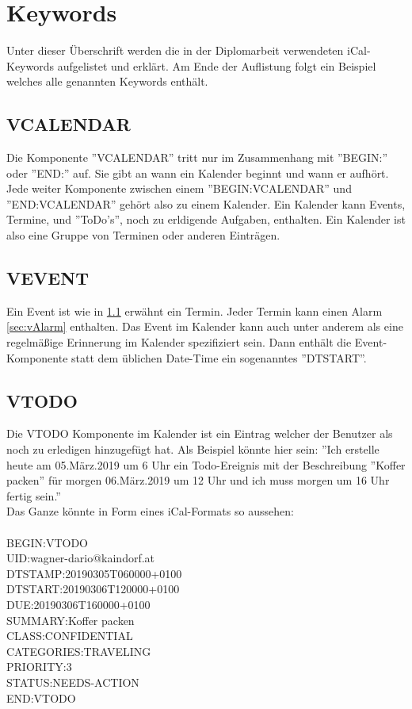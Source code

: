 \section{Keywords}
\label{sec:keywords}
Unter dieser Überschrift werden die in der Diplomarbeit verwendeten iCal-Keywords aufgelistet und erklärt. Am Ende der Auflistung folgt ein Beispiel welches alle genannten Keywords enthält. 
\subsection{VCALENDAR}
\label{sec:vCalendar} 
Die Komponente ''VCALENDAR'' tritt nur im Zusammenhang mit ''BEGIN:'' oder ''END:'' auf. Sie gibt an wann ein Kalender beginnt und wann er aufhört. Jede weiter Komponente zwischen einem ''BEGIN:VCALENDAR'' und ''END:VCALENDAR'' gehört also zu einem Kalender. Ein Kalender kann Events, Termine, und ''ToDo's'', noch zu erldigende Aufgaben, enthalten. Ein Kalender ist also eine Gruppe von Terminen oder anderen Einträgen. 
\subsection{VEVENT}
\label{sec:vEvent} 
Ein Event ist wie in \ref{sec:vCalendar} erwähnt ein Termin. Jeder Termin kann einen Alarm \ref{sec:vAlarm} enthalten. Das Event im Kalender kann auch unter anderem als eine regelmäßige Erinnerung im Kalender spezifiziert sein. Dann enthält die Event-Komponente statt dem üblichen Date-Time ein sogenanntes ''DTSTART''.
\subsection{VTODO}
\label{sec:vTodo} 
Die VTODO Komponente im Kalender ist ein Eintrag welcher der Benutzer als noch zu erledigen hinzugefügt hat. Als Beispiel könnte hier sein: ''Ich erstelle heute am 05.März.2019 um 6 Uhr ein Todo-Ereignis mit der Beschreibung ''Koffer packen'' für morgen 06.März.2019 um 12 Uhr und ich muss morgen um 16 Uhr fertig sein.'' \\
Das Ganze könnte in Form eines iCal-Formats so aussehen: \\ \\
  BEGIN:VTODO \\
  UID:wagner-dario@kaindorf.at\\
  DTSTAMP:20190305T060000+0100\\
  DTSTART:20190306T120000+0100\\
  DUE:20190306T160000+0100\\
  SUMMARY:Koffer packen\\
  CLASS:CONFIDENTIAL\\
  CATEGORIES:TRAVELING\\
  PRIORITY:3\\
  STATUS:NEEDS-ACTION\\
  END:VTODO\\
  
